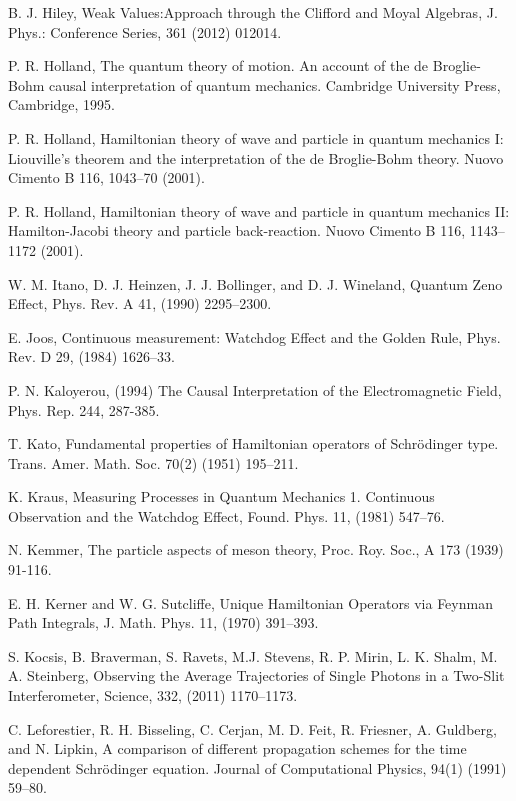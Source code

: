 \documentclass[12pt]{article}%
\begin{document}
\begin{thebibliography}{99}
B. J. Hiley, Weak Values:Approach through the Clifford and
Moyal Algebras, J. Phys.: Conference Series, 361 (2012) 012014.

P. R. Holland, The quantum theory of motion. An account of
the de Broglie-Bohm causal interpretation of quantum mechanics. Cambridge
University Press, Cambridge, 1995.

P. R. Holland, Hamiltonian theory of wave and particle in
quantum mechanics I: Liouville's theorem and the interpretation of the de
Broglie-Bohm theory. Nuovo Cimento B 116, 1043--70 (2001).

P. R. Holland, Hamiltonian theory of wave and particle in
quantum mechanics II: Hamilton-Jacobi theory and particle back-reaction. Nuovo
Cimento B 116, 1143--1172 (2001).

W. M. Itano, D. J. Heinzen, J. J. Bollinger, and D. J.
Wineland, Quantum Zeno Effect, Phys. Rev. A 41, (1990) 2295--2300.

E. Joos, Continuous measurement: Watchdog Effect and the Golden
Rule, Phys. Rev. D 29, (1984) 1626--33.

P. N. Kaloyerou, (1994) The Causal Interpretation of the
Electromagnetic Field, Phys. Rep. 244, 287-385.

T. Kato, Fundamental properties of Hamiltonian operators of
Schr\"{o}dinger type. Trans. Amer. Math. Soc. 70(2) (1951) 195--211.

K. Kraus, Measuring Processes in Quantum Mechanics 1.
Continuous Observation and the Watchdog Effect, Found. Phys. 11, (1981) 547--76.

N. Kemmer, The particle aspects of meson theory, Proc. Roy.
Soc., A 173 (1939) 91-116.

E. H. Kerner and W. G. Sutcliffe, Unique Hamiltonian
Operators via Feynman Path Integrals, J. Math. Phys. 11, (1970) 391--393.

S. Kocsis, B. Braverman, S. Ravets, M.J. Stevens, R. P.
Mirin, L. K. Shalm, M. A. Steinberg, Observing the Average Trajectories of
Single Photons in a Two-Slit Interferometer, Science, 332, (2011) 1170--1173.

C. Leforestier, R. H. Bisseling, C. Cerjan, M. D. Feit, R.
Friesner, A. Guldberg, and N. Lipkin, A comparison of different propagation
schemes for the time dependent Schr\"{o}dinger equation. Journal of
Computational Physics, 94(1) (1991) 59--80.


\end{thebibliography}
\end{document}
